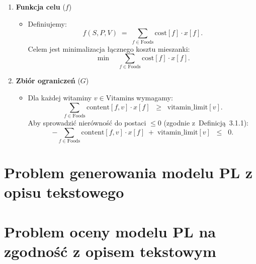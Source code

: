 \begin{enumerate}
  \item \textbf{Funkcja celu} (\boldmath$f$)
  \begin{itemize}
    \item Definiujemy:
    \[
      f(S,P,V) \;=\; \sum_{f \in \text{Foods}} \text{cost}[f] \cdot x[f].
    \]
    Celem jest minimalizacja łącznego kosztu mieszanki:
    \[
      \min \quad \sum_{f \in \text{Foods}} \text{cost}[f] \cdot x[f].
    \]
  \end{itemize}

  \item \textbf{Zbiór ograniczeń} (\boldmath$G$)
  \begin{itemize}
    \item Dla każdej witaminy $v \in \text{Vitamins}$ wymagamy:
    \[
      \sum_{f \in \text{Foods}} \text{content}[f,v] \cdot x[f]
      \;\;\geq\;\;
      \text{vitamin\_limit}[v].
    \]
    \medskip
    Aby sprowadzić nierówność do postaci $\leq 0$ (zgodnie z~Definicją~3.1.1):
    \[
      - \sum_{f \in \text{Foods}} \text{content}[f,v] \cdot x[f]
      \;+\;
      \text{vitamin\_limit}[v]
      \;\;\leq\;\; 0.
    \]
    \end{itemize}
\end{enumerate}

\section{Problem generowania modelu PL z opisu tekstowego}



\section{Problem oceny modelu PL na zgodność z opisem tekstowym}



